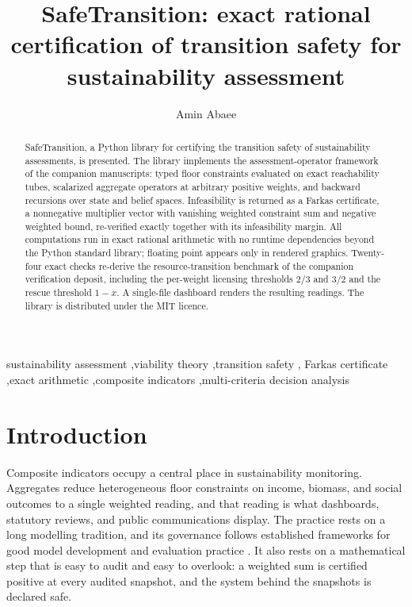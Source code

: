 \documentclass[3p,11pt]{elsarticle}
\begin{document}
\begin{frontmatter}

\title{SafeTransition: exact rational certification of transition safety for
sustainability assessment}

\author[aff]{Amin Abaee}
\address[aff]{Independent Researcher,
\href{https://orcid.org/0000-0002-0019-1842}{ORCID: 0000-0002-0019-1842},
\href{mailto:amin\_abaee@ut.ac.ir}{amin\_abaee@ut.ac.ir}}

\begin{abstract}
SafeTransition, a Python library for certifying the transition safety of
sustainability assessments, is presented. The library implements the
assessment-operator framework of the companion manuscripts: typed floor
constraints evaluated on exact reachability tubes, scalarized aggregate
operators at arbitrary positive weights, and backward recursions over state
and belief spaces. Infeasibility is returned as a Farkas certificate, a
nonnegative multiplier vector with vanishing weighted constraint sum and
negative weighted bound, re-verified exactly together with its infeasibility
margin. All computations run in exact rational arithmetic with no runtime
dependencies beyond the Python standard library; floating point appears only
in rendered graphics. Twenty-four exact checks re-derive the
resource-transition benchmark of the companion verification deposit,
including the per-weight licensing thresholds $2/3$ and $3/2$ and the rescue
threshold $1-x$. A single-file dashboard renders the resulting readings.
The library is distributed under the MIT licence.
\end{abstract}

\begin{keyword}
sustainability assessment \sep viability theory \sep transition safety \sep
Farkas certificate \sep exact arithmetic \sep composite indicators
\sep multi-criteria decision analysis
\end{keyword}

\end{frontmatter}

\section{Introduction}\label{sec:introduction}

Composite indicators occupy a central place in sustainability monitoring.
Aggregates reduce heterogeneous floor constraints on income, biomass, and
social outcomes to a single weighted reading, and that reading is what
dashboards, statutory reviews, and public communications display. The
practice rests on a long modelling tradition, and its governance follows
established frameworks for good model development and evaluation practice
\citep{Jakeman2006}. It also rests on a mathematical step that
is easy to audit and easy to overlook: a weighted sum is certified positive
at every audited snapshot, and the system behind the snapshots is declared
safe.
\end{document}
